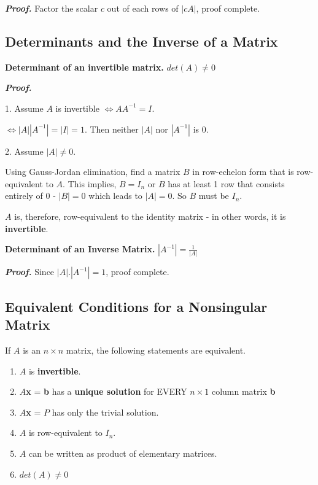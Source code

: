 \documentclass{article}
\newcommand\B{\textbf}
\newcommand\x{\times}
\begin{document}
    \B{\textit{Proof.}} Factor the scalar $c$ out of each rows of $|cA|$, proof complete.

    \subsection{Determinants and the Inverse of a Matrix}

    \begin{tcolorbox}[hbox]
        \B{Determinant of an invertible matrix.} $det(A) \neq 0$
    \end{tcolorbox}
    
    \B{\textit{Proof.}} 

    1. Assume $A$ is invertible $\Leftrightarrow AA^{-1} = I$.
    
    $\Leftrightarrow |A| |A^{-1}| = |I| = 1$. Then neither $|A|$ nor $|A^{-1}|$ is $0$.
    
    2. Assume $|A| \ne 0$. 

    Using Gauss-Jordan elimination, find a matrix $B$ in row-echelon form that is row-equivalent
    to $A$. This implies, $B = I_n$ or $B$ has at least 1 row that consists entirely of 0 - $|B| = 0$ which leads to $|A| = 0$.
    So $B$ must be $I_n$.

    $A$ is, therefore, row-equivalent to the identity matrix - in other words, it is \B{invertible}.

    \begin{tcolorbox}[hbox, colback = {blue9}]
        \B{Determinant of an Inverse Matrix.}
        $|A^{-1}| = \frac{1}{|A|}$
    \end{tcolorbox}
    \B{\textit{Proof.}} Since $|A|.|A^{-1}| = 1$, proof complete.

    \subsection{Equivalent Conditions for a Nonsingular Matrix}

    \begin{tcolorbox}[colback = {blue9}]
        If $A$ is an $n \x n$ matrix, the following statements are equivalent.
        \begin{enumerate}
            \item $A$ is \B{invertible}.
            \item $A$\B{x} = \B{b} has a \B{unique solution} for EVERY $n \x 1$ column matrix \B{b}
            \item $A$\B{x} = $P$ has only the trivial solution.
            \item $A$ is row-equivalent to $I_n$.
            \item $A$ can be written as product of elementary matrices.
            \item $det(A) \ne 0$
        \end{enumerate}
    \end{tcolorbox}
\end{document}
